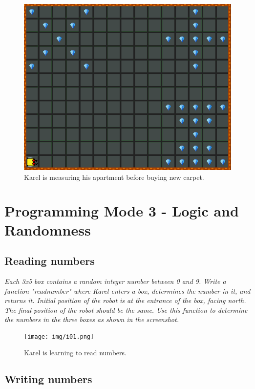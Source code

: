 \begin{figure}[!ht]
\begin{center}
\includegraphics[height=0.4\textwidth]{img/h04.png}
\end{center}
\vspace{-4mm}
\caption{Karel is measuring his apartment before buying new carpet.}
\vspace{-1cm}
\label{fig:h04}
\end{figure}


\section{Programming Mode 3 - Logic and Randomness}

\subsection{Reading numbers}

{\em Each 3x5 box contains a random integer number between 0 and 9. Write a function "readnumber" 
where Karel enters a box, determines the number in it, and returns it. Initial position of the 
robot is at the entrance of the box, facing north. The final position of the robot should be the same. 
Use this function to determine the numbers in the three boxes as shown in the screenshot. }

\begin{figure}[!ht]
\begin{center}
\texttt{[image: img/i01.png]}
\end{center}
\vspace{-4mm}
\caption{Karel is learning to read numbers.}
\label{fig:g10}
\end{figure}



\subsection{Writing numbers}

